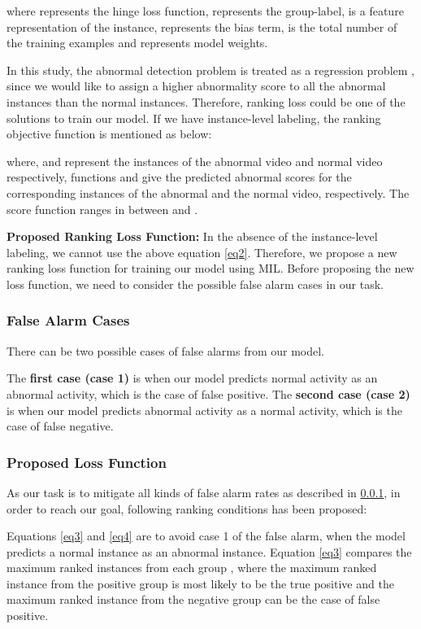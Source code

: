 \documentclass[conference]{IEEEtran}
\begin{document}
where  represents the hinge loss function,  represents the group-label,   is a feature representation of the instance,  represents the bias term,  is the total number of the training examples and  represents model weights.

In this study, the abnormal detection problem is treated as a regression problem \cite{A6}, since we would like to assign a higher abnormality score to all the abnormal instances than the normal instances. Therefore, ranking loss could be one of the solutions to train our model. If we have instance-level labeling, the ranking objective function is mentioned as below:

where,  and  represent the instances of the abnormal video and normal video respectively, functions  and  give the predicted abnormal scores for the corresponding instances of the abnormal and the normal video, respectively. The score function  ranges in between  and .
 
 \textbf{ Proposed Ranking Loss Function:} In the absence of the instance-level labeling, we cannot use the above equation \ref{eq2}. Therefore, we propose a new ranking loss function for training our model using MIL. Before proposing the new loss function, we need to consider the possible false alarm cases in our task. 
 \subsubsection{False Alarm Cases} \label{FalseAlarm}There can be two possible cases of false alarms from our model. 
 
 The \textbf{first case (case 1)} is when our model predicts normal activity as an abnormal activity, which is the case of false positive. The \textbf{second case (case 2)} is when our model predicts abnormal activity as a normal activity, which is the case of false negative. 
 \subsubsection{Proposed Loss Function} \label{ProposedLoss}As our task is to mitigate all kinds of false alarm rates as described in \ref{FalseAlarm}, in order to reach our goal, following ranking conditions has been proposed:  
 
 



Equations \ref{eq3} and \ref{eq4} are to avoid case 1 of the false alarm, when the model predicts a normal instance as an abnormal instance. Equation \ref{eq3} compares the maximum ranked instances from each group \cite{A6}, where the maximum ranked instance from the positive group is most likely to be the true positive and the maximum ranked instance from the negative group can be the case of false positive. 
\end{document}
